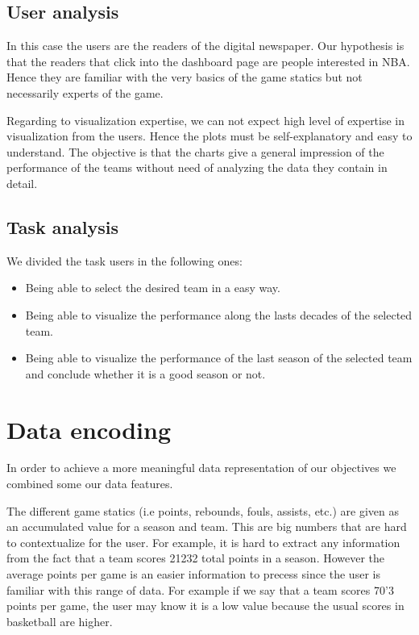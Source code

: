 \documentclass[11pt, a4paper]{article}
\begin{document}
\subsection{User analysis}

In this case the users are the readers of the digital newspaper. Our hypothesis is that the readers that click into the dashboard page are people interested in NBA. Hence they are familiar with the very basics of the game statics but not necessarily experts of the game.

Regarding to visualization expertise, we can not expect high level of expertise in visualization from the users. Hence the plots must be self-explanatory and easy to understand. The objective is that the charts give a general impression of the performance of the teams without need of analyzing the data they contain  in detail.

\subsection{Task analysis}

We divided the task users in the following ones:

\begin{itemize}
\item Being able to select the desired team in a easy way.
\item Being able to visualize the performance along the lasts decades of the selected team.
\item Being able to visualize the performance of the last season of the selected team and conclude whether it is a good season or not.

\end{itemize}

\section{Data encoding}
In order to achieve a more meaningful data representation of our objectives we combined some our data features.

\medskip
The different game statics (i.e points, rebounds, fouls, assists, etc.) are given as an accumulated value for  a season and team. This are big numbers that  are hard to contextualize for the user. For example, it is hard to extract any information from the fact that a team scores 21232 total points in a season. However the average points per game is an easier  information to precess since the user is familiar with this range of data. For example if we say that a team scores 70'3 points per game, the user may know it is a low value because the usual scores in basketball are higher.
\medskip
\end{document}
